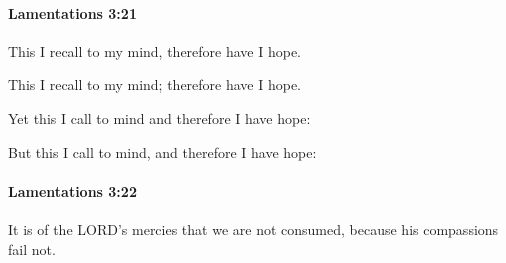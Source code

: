 		\paragraph{Lamentations 3:21} %
			\label{LAMENTATIONS-3-21}

			This I recall to my mind, therefore have I hope.

			\begin{versebox}
					\item[BHS] 
					\item[LXX] 
					\item[ASV] This I recall to my mind; therefore have I hope.
					\item[NIV] Yet this I call to mind and therefore I have hope:
					\item[NRSV] But this I call to mind, and therefore I have hope:
			\end{versebox}

		\paragraph{Lamentations 3:22} %
			\label{LAMENTATIONS-3-22}

			It is of the LORD’s mercies that we are not consumed, because his compassions fail not.

